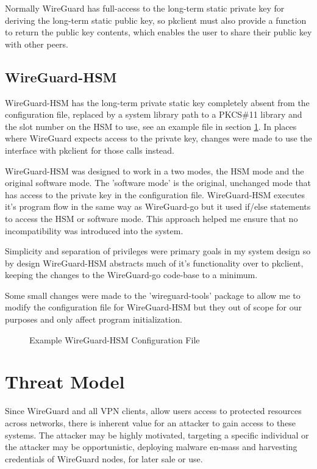 \documentclass [11pt, proquest] {uwthesis}[2020/02/24]
\begin{document}
Normally WireGuard has full-access to the long-term static private key for deriving the long-term static public key, so pkclient must also provide a function to return the public key contents, which enables the user to share their public key with other peers.


\subsection{WireGuard-HSM}
WireGuard-HSM has the long-term private static key completely absent from the configuration file, replaced by a system library path to a PKCS\#11 library and the slot number on the HSM to use, see an example file in section \ref{fig:wg_hsm_config}.  In places where WireGuard expects access to the private key, changes were made to use the interface with pkclient for those calls instead.

WireGuard-HSM was designed to work in a two modes, the HSM mode and the original software mode. 
The 'software mode' is the original, unchanged mode that has access to the private key in the configuration file. WireGuard-HSM executes it's program flow in the same way as WireGuard-go but it used if/else statements to access the HSM or software mode. This approach helped me ensure that no incompatibility was introduced into the system. 

Simplicity and separation of privileges were primary goals in my system design so by design WireGuard-HSM abstracts much of it's functionality over to pkclient, keeping the changes to the WireGuard-go code-base to a minimum. 

Some small changes were made to the 'wireguard-tools' package to allow me to modify the configuration file for WireGuard-HSM but they out of scope for our purposes and only affect program initialization.

\begin{figure}[ht]
\caption{Example WireGuard-HSM Configuration File}
\label{fig:wg_hsm_config}
\end{figure}

\section{Threat Model}
Since WireGuard and all VPN clients, allow users access to protected resources across networks, there is inherent value for an attacker to gain access to these systems.
The attacker may be highly motivated, targeting a specific individual or the attacker may be opportunistic, deploying malware en-mass and harvesting credentials of WireGuard nodes, for later sale or use.
\end{document}

